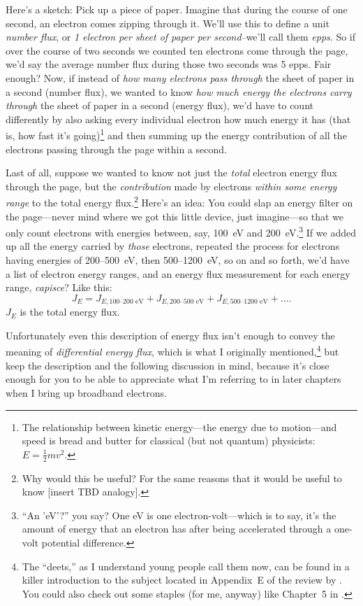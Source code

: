 Here's a sketch: Pick up a piece of paper. Imagine that during the
course of one second, an electron comes zipping through it. We'll use
this to define a unit \emph{number flux}, or \emph {1 electron per
  sheet of paper per second}--we'll call them \emph{epps}. So if over
the course of two seconds we counted ten electrons come through the
page, we'd say the average number flux during those two seconds was 5
epps. Fair enough?  Now, if instead of \emph{how many electrons pass
  through} the sheet of paper in a second (number flux), we wanted to
know \emph{how much energy the electrons carry through} the sheet of
paper in a second (energy flux), we'd have to count differently by
also asking every individual electron how much energy it has (that is,
how fast it's going)\footnote{The relationship between kinetic
  energy---the energy due to motion---and speed is bread and butter
  for classical (but not quantum) physicists: $E = \frac{1}{2}m v^2.$}
and then summing up the energy contribution of all the electrons
passing through the page within a second.

Last of all, suppose we wanted to know not just the \emph{total}
electron energy flux through the page, but the \emph{contribution}
made by electrons \emph{within some energy range} to the total energy
flux.\footnote{Why would this be useful?  For the same reasons that it
  would be useful to know [insert TBD analogy].}  Here's an idea: You
could slap an energy filter on the page---never mind where we got this
little device, just imagine---so that we only count electrons with
energies between, say, 100~eV and 200~eV.\footnote{``An 'eV'?''  you
  say? One eV is one electron-volt---which is to say, it's the amount
  of energy that an electron has after being accelerated through a
  one-volt potential difference.} If we added up all the energy
carried by \emph{those} electrons, repeated the process for electrons
having energies of 200--500~eV, then 500--1200~eV, so on and so forth,
we'd have a list of electron energy ranges, and an energy flux
measurement for each energy range, \emph{capisce}? Like this:
\begin{equation}
  \label{ch1:eqeFlux}
  J_{E} = J_{E,\textrm{100--200 eV}} + J_{E,\textrm{200--500 eV}} + J_{E,\textrm{500--1200 eV}} + \dots .
\end{equation}
$J_E$ is the total energy flux.

Unfortunately even this description of energy flux isn't enough to
convey the meaning of \emph{differential energy flux}, which is what I
originally mentioned,\footnote{The ``deets,'' as I understand young
  people call them now, can be found in a killer introduction to the
  subject located in Appendix~E of the review by
  \citet{Bruno2013}. You could also check out some staples (for me,
  anyway) like Chapter~5 in \citet{Paschmann1998}.} but keep the
description and the following discussion in mind, because it's close
enough for you to be able to appreciate what I'm referring to in later
chapters when I bring up broadband electrons.

